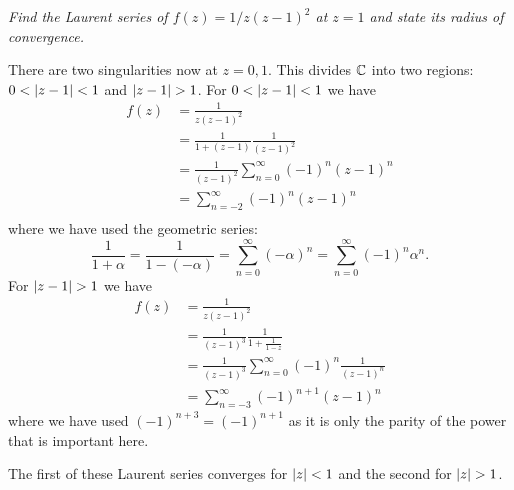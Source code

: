 \documentclass{article}
\begin{document}
    \begin{example}
        \textit{Find the Laurent series of \(f(z) = 1/z(z - 1)^2\) at \(z = 1\) and state its radius of convergence.}
        
        There are two singularities now at \(z = 0, 1\).
        This divides \(\mathbb{C}\) into two regions: \(0 < \abs{z - 1} < 1\) and \(\abs{z - 1} > 1\).
        For \(0 < \abs{z - 1} < 1\) we have
        \begin{align*}
            f(z) &= \frac{1}{z(z - 1)^2}\\
            &= \frac{1}{1 + (z - 1)}\frac{1}{(z - 1)^2}\\
            &= \frac{1}{(z - 1)^2}\sum_{n=0}^{\infty} (-1)^n(z - 1)^n\\
            &= \sum_{n=-2}^{\infty} (-1)^n(z - 1)^n\\
        \end{align*}
        where we have used the geometric series:
        \[\frac{1}{1 + \alpha} = \frac{1}{1 - (-\alpha)} = \sum_{n=0}^{\infty} (-\alpha)^n = \sum_{n=0}^{\infty} (-1)^n\alpha^n.\]
        For \(\abs{z - 1} > 1\) we have
        \begin{align*}
            f(z) &= \frac{1}{z(z - 1)^2}\\
            &= \frac{1}{(z - 1)^3}\frac{1}{1 + \frac{1}{1 - z}}\\
            &= \frac{1}{(z - 1)^3}\sum_{n=0}^{\infty} (-1)^n\frac{1}{(z - 1)^n}\\
            &= \sum_{n=-3}^{\infty} (-1)^{n+1}(z - 1)^n
        \end{align*}
        where we have used \((-1)^{n+3} = (-1)^{n+1}\) as it is only the parity of the power that is important here.
        
        The first of these Laurent series converges for \(\abs{z} < 1\) and the second for \(\abs{z} > 1\).
    \end{example}
    
\end{document}
